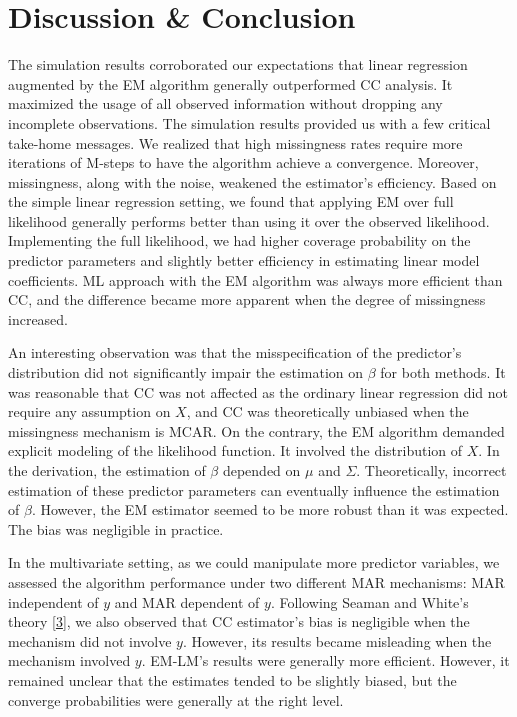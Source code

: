 \documentclass[
  twocolumn]{article}
\begin{document}
\hypertarget{discussion-conclusion}{%
\section{Discussion \& Conclusion}\label{discussion-conclusion}}

The simulation results corroborated our expectations that linear
regression augmented by the EM algorithm generally outperformed CC
analysis. It maximized the usage of all observed information without
dropping any incomplete observations. The simulation results provided us
with a few critical take-home messages. We realized that high
missingness rates require more iterations of M-steps to have the
algorithm achieve a convergence. Moreover, missingness, along with the
noise, weakened the estimator's efficiency. Based on the simple linear
regression setting, we found that applying EM over full likelihood
generally performs better than using it over the observed likelihood.
Implementing the full likelihood, we had higher coverage probability on
the predictor parameters and slightly better efficiency in estimating
linear model coefficients. ML approach with the EM algorithm was always
more efficient than CC, and the difference became more apparent when the
degree of missingness increased.

An interesting observation was that the misspecification of the
predictor's distribution did not significantly impair the estimation on
\(\beta\) for both methods. It was reasonable that CC was not affected
as the ordinary linear regression did not require any assumption on
\(X\), and CC was theoretically unbiased when the missingness mechanism
is MCAR. On the contrary, the EM algorithm demanded explicit modeling of
the likelihood function. It involved the distribution of \(X\). In the
derivation, the estimation of \(\beta\) depended on \(\mu\) and
\(\Sigma\). Theoretically, incorrect estimation of these predictor
parameters can eventually influence the estimation of \(\beta\).
However, the EM estimator seemed to be more robust than it was expected.
The bias was negligible in practice.

In the multivariate setting, as we could manipulate more predictor
variables, we assessed the algorithm performance under two different MAR
mechanisms: MAR independent of \(y\) and MAR dependent of \(y\).
Following Seaman and White's theory
{[}\protect\hyperlink{ref-seaman2013review}{3}{]}, we also observed that
CC estimator's bias is negligible when the mechanism did not involve
\(y\). However, its results became misleading when the mechanism
involved \(y\). EM-LM's results were generally more efficient. However,
it remained unclear that the estimates tended to be slightly biased, but
the converge probabilities were generally at the right level.
\end{document}
